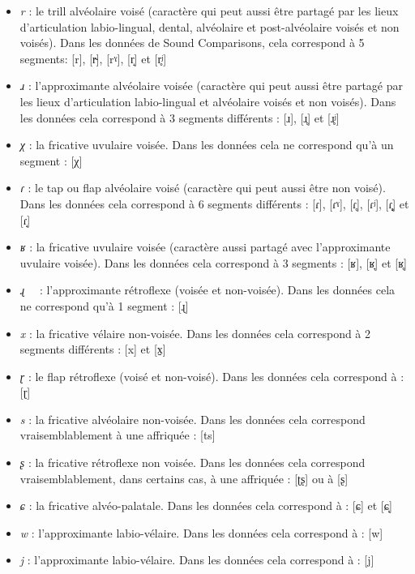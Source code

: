 \begin{itemize}
	\item \textit{r} : le trill alvéolaire voisé (caractère qui peut aussi être partagé par les lieux d'articulation labio-lingual, dental, alvéolaire et post-alvéolaire voisés et non voisés). Dans les données de Sound Comparisons, cela correspond à 5 segments: [r], [r̴], [rˠ], [r̝] et [r̥ʲ]
	\item \textit{ɹ} : l'approximante alvéolaire voisée (caractère qui peut aussi être partagé par les lieux d'articulation labio-lingual et alvéolaire voisés et non voisés). Dans les données cela correspond à 3 segments différents : [ɹ], [ɹ̥] et [ɹ̥ʲ]
	\item \textit{χ} : la fricative uvulaire voisée. Dans les données cela ne correspond qu'à un segment : [χ]
	\item \textit{ɾ} : le tap ou flap alvéolaire voisé (caractère qui peut aussi être non voisé). Dans les données cela correspond à 6 segments différents : [ɾ], [ɾˠ], [ɾ̥], [ɾʲ], [ɾ̝̥] et [ɾ̝]
	\item \textit{ʁ} : la fricative uvulaire voisée (caractère aussi partagé avec l'approximante uvulaire voisée). Dans les données cela correspond à 3 segments : [ʁ], [ʁ̞] et [ʁ̥]
	\item \textit{ɻ}~~ : l'approximante rétroflexe (voisée et non-voisée). Dans les données cela ne correspond qu'à 1 segment : [ɻ]
	\item \textit{x} : la fricative vélaire non-voisée. Dans les données cela correspond à 2 segments différents : [x] et [x̠]
	\item \textit{ɽ} : le flap rétroflexe (voisé et non-voisé). Dans les données cela correspond à : [ɽ]
	\item \textit{s} : la fricative alvéolaire non-voisée. Dans les données cela correspond vraisemblablement à une affriquée : [ts]
	\item \textit{ʂ} : la fricative rétroflexe non voisée. Dans les données cela correspond vraisemblablement, dans certains cas, à une affriquée : [ʈʂ] ou à [ʂ]
	\item \textit{ɕ} : la fricative alvéo-palatale. Dans les données cela correspond à : [ɕ] et [ɕ̝]
	\item \textit{w} : l'approximante labio-vélaire. Dans les données cela correspond à : [w]
	\item \textit{j} : l'approximante labio-vélaire. Dans les données cela correspond à : [j]
\end{itemize}

